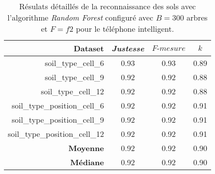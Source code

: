 \begin{table}[H]\renewcommand{\arraystretch}{0.5}
	\centering
	\caption{Résulats détaillés de la reconnaissance des sols avec l'algorithme \textit{Random Forest} configuré avec $B=300$ arbres et $F=f2$ pour le téléphone intelligent.}
	\label{tab:rf-300-f2-cell}
	\begin{tabular}{@{}rccc@{}}
		\toprule
			\textbf{Dataset} & \textit{Justesse} & $F\mbox{-} mesure$ & \textbf{$k$} \\
		\midrule
			soil\_type\_cell\_6 & 0.93 & 0.93 & 0.89 \\
			soil\_type\_cell\_9 & 0.92 & 0.92 & 0.88 \\
			soil\_type\_cell\_12 & 0.92 & 0.92 & 0.88 \\
			soil\_type\_position\_cell\_6 & 0.92 & 0.92 & 0.91 \\
			soil\_type\_position\_cell\_9 & 0.92 & 0.92 & 0.91 \\
			soil\_type\_position\_cell\_12 & 0.92 & 0.92 & 0.91 \\
			\textbf{Moyenne} & 0.92 & 0.92 & 0.90 \\
			\textbf{Médiane} & 0.92 & 0.92 & 0.90 \\
		\bottomrule
	\end{tabular}
\end{table}

